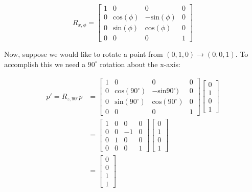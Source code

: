 \documentclass[12pt,letterpaper]{article}
\begin{document}
\begin{equation}
    R_{x, \phi} = \begin{bmatrix}
        1 & 0 & 0 & 0 \\
        0 & \text{cos}(\phi) & -\text{sin}(\phi) & 0 \\
        0 & \text{sin}(\phi) &  \text{cos}(\phi) & 0 \\
        0 & 0 & 0 & 1
    \end{bmatrix}
\end{equation}

\newpage

Now, suppose we would like to rotate a point from $(0, 1, 0) \rightarrow (0, 0, 1)$. To accomplish this we need a $90^{\circ}$ rotation about the x-axis:

\begin{equation}
    \begin{aligned}
    p' = R_{z, 90^{\circ}}p
    &= \begin{bmatrix}
        1 & 0 & 0 & 0 \\
        0 & \text{cos}(90^{\circ}) & -\text{sin}90^{\circ}) & 0 \\
        0 & \text{sin}(90^{\circ}) &  \text{cos}(90^{\circ}) & 0 \\
        0 & 0 & 0 & 1
    \end{bmatrix}
     \begin{bmatrix}
        0 \\
        1 \\
        0 \\
        1
    \end{bmatrix} \\
    &= \begin{bmatrix}
        1 & 0 &  0 & 0 \\
        0 & 0 & -1 & 0 \\
        0 & 1 &  0 & 0 \\
        0 & 0 &  0 & 1
    \end{bmatrix}
     \begin{bmatrix}
        0 \\
        1 \\
        0 \\
        1
    \end{bmatrix} \\
    &= \begin{bmatrix}
        0 \\
        0 \\
        1 \\
        1
    \end{bmatrix}
    \end{aligned}
\end{equation}
\end{document}
